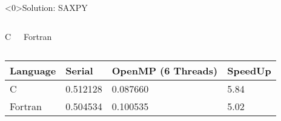 \documentclass[10pt,t]{beamer}
\begin{document}
\begin{frame}<0>{Solution: SAXPY}
  \vspace{-0.5cm}
  \begin{columns}
    \begin{exampleblock}{C}
      
    \end{exampleblock}
    \begin{exampleblock}{Fortran}
      
    \end{exampleblock}
  \end{columns}
  \begin{columns}
    {
      \begin{exampleblock}{}
        \begin{tabular}{|b|b|b|b|}
          \hline
          \rowcolor{lublue}Language & Serial & OpenMP (6 Threads) & SpeedUp \\
          \hline
          C & 0.512128 & 0.087660 & 5.84 \\ \hline
          Fortran & 0.504534 & 0.100535 & 5.02 \\
          \hline
        \end{tabular}
      \end{exampleblock}
    }
  \end{columns}
\end{frame}
\end{document}

